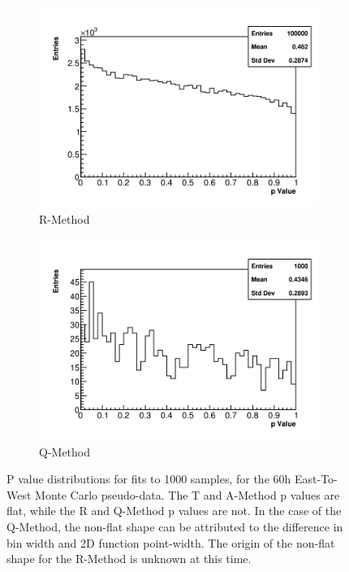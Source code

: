 \begin{figure}
    \begin{subfigure}[t]{0.45\textwidth}
        \centering
        \includegraphics[width=\textwidth]{PValues_RMethod}
        \caption{R-Method}
    \end{subfigure}
    \hspace{1mm}
    \begin{subfigure}[t]{0.45\textwidth}
        \centering
        \includegraphics[width=\textwidth]{PValues_QMethod}
        \caption{Q-Method}
    \end{subfigure}
\caption[]{P value distributions for fits to 1000 samples, for the 60h East-To-West Monte Carlo pseudo-data. The T and A-Method p values are flat, while the R and Q-Method p values are not. In the case of the Q-Method, the non-flat shape can be attributed to the difference in bin width and 2D function point-width. The origin of the non-flat shape for the R-Method is unknown at this time.}
\label{fig:pValues}
\end{figure}


